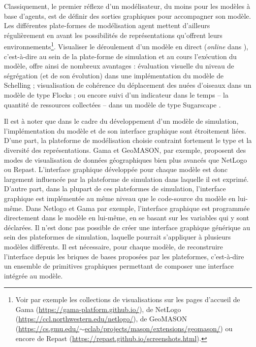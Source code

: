 	Classiquement, le premier réflexe d'un modélisateur, du moins pour les modèles à base d'agents, est de définir des sorties graphiques pour accompagner son modèle.
	Les différentes plate-formes de modélisation agent mettent d'ailleurs régulièrement en avant les possibilités de représentations qu'offrent leurs environnements\footnote{
		Voir par exemple les collections de visualisations sur les pages d'accueil de Gama (\href{https://gama-platform.github.io/}{https://gama-platform.github.io/}), de NetLogo (\href{https://ccl.northwestern.edu/netlogo/}{https://ccl.northwestern.edu/netlogo/}), de GeoMASON (\href{https://cs.gmu.edu/~eclab/projects/mason/extensions/geomason/}{https://cs.gmu.edu/$\sim$eclab/projects/mason/extensions/geomason/}) ou encore de Repast (\href{https://repast.github.io/screenshots.html}{https://repast.github.io/screenshots.html}).
	}.
	Visualiser le déroulement d'un modèle \og en direct\fg{} (\og \textit{online}\fg{} dans \cite{grignard_agent-based_2017}), c'est-à-dire au sein de la plate-forme de simulation et au cours l'exécution du modèle, offre ainsi de nombreux avantages : évaluation visuelle du niveau de ségrégation (et de son évolution) dans une implémentation du modèle de Schelling ; visualisation de cohérence du déplacement des nuées d'oiseaux dans un modèle de type \og Flocks\fg{} \autocite{reynolds_flocks_1987} ; ou encore suivi d'un indicateur dans le temps -- la quantité de ressources collectées -- dans un modèle de type \og Sugarscape\fg{} \autocite{epstein_growing_1996}.
	
	Il est à noter que dans le cadre du développement d'un modèle de simulation, l'implémentation du modèle et de son interface graphique sont étroitement liées.
	D'une part, la plateforme de modélisation choisie contraint fortement le type et la diversité des représentations.
	Gama et GeoMASON, par exemple, proposent des modes de visualisation de données géographiques bien plus avancés que NetLogo ou Repast.
	L'interface graphique développée pour chaque modèle est donc largement influencée par la plateforme de simulation dans laquelle il est exprimé.
	D'autre part, dans la plupart de ces plateformes de simulation, l'interface graphique est implémentée au même niveau que le code-source du modèle en lui-même.
	Dans Netlogo et Gama par exemple, l'interface graphique est programmée directement dans le modèle en lui-même, en se basant sur les variables qui y sont déclarées.
	Il n'est donc pas possible de créer une interface graphique générique au sein des plateformes de simulation, laquelle pourrait s'appliquer à plusieurs modèles différents.
	Il est nécessaire, pour chaque modèle, de reconstruire l'interface depuis les briques de bases proposées par les plateformes, c'est-à-dire un ensemble de primitives graphiques permettant de composer une interface intégrée au modèle.

